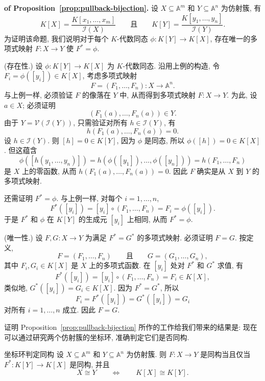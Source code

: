 \begin{Proof}\textbf{of Proposition~\ref{prop:pullback-bijection}.}\quad
  设 $X\subseteq\mathbb{A}^{m}$ 和 $Y\subseteq\mathbb{A}^{n}$ 为仿射簇, 有
  \[
    K[X]=\frac{K[x_{1},\ldots,x_{m}]}{\mathcal{I}(X)}
    \qquad\text{且}\qquad
    K[Y]=\frac{K[y_{1},\ldots,y_{n}]}{\mathcal{I}(Y)}.
  \]
  为证明该命题, 我们说明对于每个 $K$-代数同态 $\phi:K[Y]\to K[X]$, 存在唯一的多项式映射 $F:X\to Y$ 使 $F^{*}=\phi$.

  (存在性.) 设 $\phi:K[Y]\to K[X]$ 为 $K$-代数同态. 沿用上例的构造, 令 $F_{i}=\phi([y_{i}])\in K[X]$, 考虑多项式映射
  \[
    F=(F_{1},\ldots,F_{n}):X\to\mathbb{A}^{n}.
  \]
  与上例一样, 必须验证 $F$ 的像落在 $Y$ 中, 从而得到多项式映射 $F:X\to Y$. 为此, 设 $a\in X$; 必须证明
  \[
    (F_{1}(a),\ldots,F_{n}(a))\in Y.
  \]
  由于 $Y=\mathcal{V}(\mathcal{I}(Y))$, 只需验证对所有 $h\in\mathcal{I}(Y)$, 有
  \[
    h(F_{1}(a),\ldots,F_{n}(a))=0.
  \]
  设 $h\in\mathcal{I}(Y)$. 则 $[h]=0\in K[Y]$, 因为 $\phi$ 是同态, 所以 $\phi([h])=0\in K[X]$. 但这蕴含
  \[
    \phi([h(y_{1},\ldots,y_{n})])=h(\phi([y_{1}]),\ldots,\phi([y_{n}]))=h(F_{1},\ldots,F_{n})
  \]
  是 $X$ 上的零函数, 从而 $h(F_{1}(a),\ldots,F_{n}(a))=0$. 因此 $F$ 确实是从 $X$ 到 $Y$ 的多项式映射.

  还需证明 $F^{*}=\phi$. 与上例一样, 对每个 $i=1,\ldots,n$,
  \[
    F^{*}([y_{i}])=[y_{i}]\circ(F_{1},\ldots,F_{n})=F_{i}=\phi([y_{i}]).
  \]
  于是 $F^{*}$ 和 $\phi$ 在 $K[Y]$ 的生成元 $[y_{i}]$ 上相同, 从而 $F^{*}=\phi$.

  (唯一性.) 设 $F,G:X\to Y$ 为满足 $F^{*}=G^{*}$ 的多项式映射. 必须证明 $F=G$. 按定义,
  \[
    F=(F_{1},\ldots,F_{n})\qquad\text{且}\qquad G=(G_{1},\ldots,G_{n}),
  \]
  其中 $F_{i},G_{i}\in K[X]$ 是 $X$ 上的多项式函数. 在 $[y_{i}]$ 处对 $F^{*}$ 和 $G^{*}$ 求值, 有
  \[
    F^{*}([y_{i}])=[y_{i}]\circ(F_{1},\ldots,F_{n})=F_{i}\in K[X],
  \]
  类似地, $G^{*}([y_{i}])=G_{i}\in K[X]$. 因为 $F^{*}=G^{*}$, 所以
  \[
    F_{i}=F^{*}([y_{i}])=G^{*}([y_{i}])=G_{i}
  \]
  对所有 $i=1,\ldots,n$ 成立. 因此 $F=G$.
\end{Proof}

证明 Proposition~\ref{prop:pullback-bijection} 所作的工作给我们带来的结果是: 现在可以通过研究两个仿射簇的坐标环, 准确判定它们是否同构.

\begin{Corollary}{坐标环判定同构}\leavevmode\label{cor:coordinate-rings-detect-isomorphisms}
  设 $X\subseteq\mathbb{A}^{m}$ 和 $Y\subseteq\mathbb{A}^{n}$ 为仿射簇. 则 $F:X\to Y$ 是同构当且仅当 $F^{*}:K[Y]\to K[X]$ 是同构, 并且
  \[
    X\cong Y\qquad\Longleftrightarrow\qquad K[X]\cong K[Y].
  \]
\end{Corollary}

